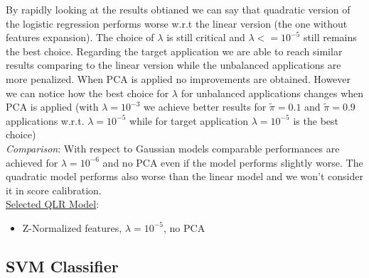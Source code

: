\documentclass[10pt, a4paper, twocolumn]{article} %
\begin{document}
By rapidly looking at the results obtianed we can say that quadratic version of the logistic regression
performs worse w.r.t the linear version (the one without features expansion). The choice of $\lambda$
is still critical and $\lambda <= 10^{-5}$ still remains the best choice. Regarding the target application
we are able to reach similar results comparing to the linear version while the unbalanced applications
are more penalized. When PCA is applied no improvements are obtained. However we can notice how the best
choice for $\lambda$ for unbalanced applications changes when PCA is applied (with $\lambda=10^{-3}$ we 
achieve better results for $\tilde{{\pi}}=0.1$ and $\tilde{{\pi}}=0.9$ applications w.r.t. $\lambda=10^{-5}$ while for target application $\lambda=10^{-5}$ is the best choice)
\\
\textit{Comparison}: With respect to Gaussian models comparable performances are achieved for $\lambda=10^{-6}$ and
no PCA even if the model performs slightly worse. The quadratic model performs also worse than the linear model and
we won't consider it in score calibration.
\\ 
\underline{Selected QLR Model}: 
\begin{itemize}
	\item Z-Normalized features, $\lambda=10^{-5}$, no PCA
\end{itemize}
\subsection{SVM Classifier}
\end{document}
